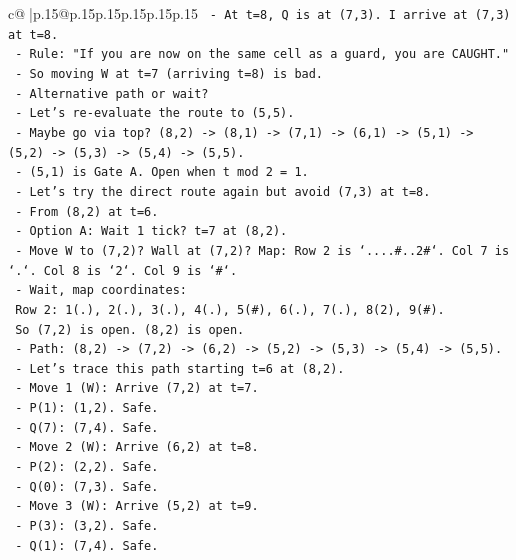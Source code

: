 \documentclass{article}
\begin{document}
{\begin{supertabular}{c@{$\;$}|p{.15\linewidth}@{}p{.15\linewidth}p{.15\linewidth}p{.15\linewidth}p{.15\linewidth}p{.15\linewidth}}
{{{\texttt{       {-} At t=8, Q is at (7,3). I arrive at (7,3) at t=8.} \\
\texttt{       {-} Rule: "If you are now on the same cell as a guard, you are CAUGHT."} \\
\texttt{       {-} So moving W at t=7 (arriving t=8) is bad.} \\
\texttt{   {-} Alternative path or wait?} \\
\texttt{   {-} Let's re{-}evaluate the route to (5,5).} \\
\texttt{   {-} Maybe go via top? (8,2) {-}> (8,1) {-}> (7,1) {-}> (6,1) {-}> (5,1) {-}> (5,2) {-}> (5,3) {-}> (5,4) {-}> (5,5).} \\
\texttt{     {-} (5,1) is Gate A. Open when t mod 2 = 1.} \\
\texttt{     {-} Let's try the direct route again but avoid (7,3) at t=8.} \\
\texttt{     {-} From (8,2) at t=6.} \\
\texttt{     {-} Option A: Wait 1 tick? t=7 at (8,2).} \\
\texttt{       {-} Move W to (7,2)? Wall at (7,2)? Map: Row 2 is `....\#..2\#`. Col 7 is `.`. Col 8 is `2`. Col 9 is `\#`.} \\
\texttt{       {-} Wait, map coordinates:} \\
\texttt{         Row 2: 1(.), 2(.), 3(.), 4(.), 5(\#), 6(.), 7(.), 8(2), 9(\#).} \\
\texttt{         So (7,2) is open. (8,2) is open.} \\
\texttt{       {-} Path: (8,2) {-}> (7,2) {-}> (6,2) {-}> (5,2) {-}> (5,3) {-}> (5,4) {-}> (5,5).} \\
\texttt{       {-} Let's trace this path starting t=6 at (8,2).} \\
\texttt{       {-} Move 1 (W): Arrive (7,2) at t=7.} \\
\texttt{         {-} P(1): (1,2). Safe.} \\
\texttt{         {-} Q(7): (7,4). Safe.} \\
\texttt{       {-} Move 2 (W): Arrive (6,2) at t=8.} \\
\texttt{         {-} P(2): (2,2). Safe.} \\
\texttt{         {-} Q(0): (7,3). Safe.} \\
\texttt{       {-} Move 3 (W): Arrive (5,2) at t=9.} \\
\texttt{         {-} P(3): (3,2). Safe.} \\
\texttt{         {-} Q(1): (7,4). Safe.} \\
}}}
\end{supertabular}}
\end{document}
